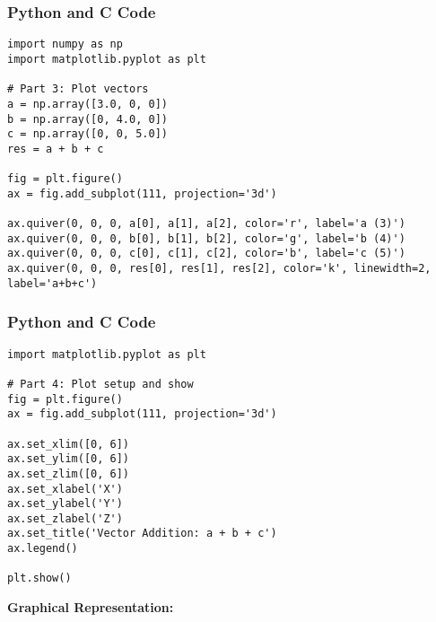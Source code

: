 \documentclass{beamer}
\begin{document}
    \begin{frame}[fragile]
\frametitle{Python and C Code}

\begin{lstlisting}
import numpy as np
import matplotlib.pyplot as plt

# Part 3: Plot vectors
a = np.array([3.0, 0, 0])
b = np.array([0, 4.0, 0])
c = np.array([0, 0, 5.0])
res = a + b + c

fig = plt.figure()
ax = fig.add_subplot(111, projection='3d')

ax.quiver(0, 0, 0, a[0], a[1], a[2], color='r', label='a (3)')
ax.quiver(0, 0, 0, b[0], b[1], b[2], color='g', label='b (4)')
ax.quiver(0, 0, 0, c[0], c[1], c[2], color='b', label='c (5)')
ax.quiver(0, 0, 0, res[0], res[1], res[2], color='k', linewidth=2, label='a+b+c')

\end{lstlisting}

\end{frame}



    \begin{frame}[fragile]
\frametitle{Python and C Code}

\begin{lstlisting}
import matplotlib.pyplot as plt

# Part 4: Plot setup and show
fig = plt.figure()
ax = fig.add_subplot(111, projection='3d')

ax.set_xlim([0, 6])
ax.set_ylim([0, 6])
ax.set_zlim([0, 6])
ax.set_xlabel('X')
ax.set_ylabel('Y')
ax.set_zlabel('Z')
ax.set_title('Vector Addition: a + b + c')
ax.legend()

plt.show()

\end{lstlisting}

\end{frame}



\textbf{Graphical Representation:}
\end{document}
